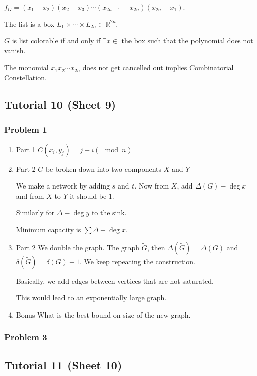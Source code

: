 \documentclass[11pt]{article}
\def\R{\mathbb{R}}
\begin{document}
\(f_G = (x_1 -x_2)(x_2 - x_3) \cdots (x_{2n-1} - x_{2n})(x_{2n} - x_1)\).

The list is a box \(L_1 \times \cdots \times L_{2n} \subset \R^{2n}\).

\(G\) is list colorable if and only if \(\exists x \in\) the box such that the
polynomial does not vanish.

The monomial \(x_1x_2\cdots x_{2n}\) does not get cancelled out implies
Combinatorial Constellation.
\subsection{Tutorial 10 (Sheet 9)}
\label{sec:org879ac7b}
\subsubsection{Problem 1}
\label{sec:org965f1a9}
\begin{enumerate}
\item Part 1
\label{sec:org551d510}
\(C(x_i, y_j) = j - i (\mod n)\)
\item Part 2
\label{sec:org62f5299}
\(G\) be broken down into two components \(X\) and \(Y\)

We make a network by adding \(s\) and \(t\). Now from \(X\), add \(\Delta(G) -
     \deg x\) and from \(X\) to \(Y\) it should be \(1\).

Similarly for \(\Delta - \deg y\) to the sink.

Minimum capacity is \(\sum \Delta - \deg x\).
\item Part 2
\label{sec:org6275d62}
We double the graph. The graph \(\tilde{G}\), then \(\Delta(\tilde G) =
     \Delta(G)\) and \(\delta(\tilde{G}) = \delta(G) + 1\). We keep repeating the
construction.

Basically, we add edges between vertices that are not saturated.

This would lead to an exponentially large graph.
\item Bonus
\label{sec:orgbc3d4e3}
What is the best bound on size of the new graph.
\end{enumerate}
\subsubsection{Problem 3}
\label{sec:org26986a7}
\subsection{Tutorial 11 (Sheet 10)}
\label{sec:orgd9b0ea0}
\end{document}
